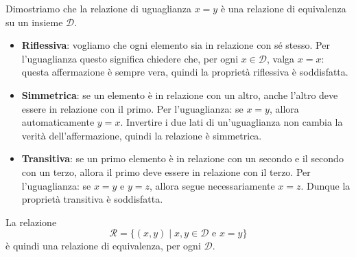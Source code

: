 \begin{esempio}
Dimostriamo che la relazione di uguaglianza \(x = y\) è una relazione di equivalenza su un insieme \(\mathcal{D}\).

\begin{itemize}
    \item \textbf{Riflessiva}: vogliamo che ogni elemento sia in relazione con sé stesso.
    Per l'uguaglianza questo significa chiedere che, per ogni \(x \in \mathcal{D}\), valga \(x = x\):
    questa affermazione è sempre vera, quindi la proprietà riflessiva è soddisfatta.

    \item \textbf{Simmetrica}: se un elemento è in relazione con un altro, anche l’altro deve essere
    in relazione con il primo. Per l'uguaglianza: se \(x = y\), allora automaticamente \(y = x\).
    Invertire i due lati di un'uguaglianza non cambia la verità dell'affermazione, quindi la relazione è simmetrica.

    \item \textbf{Transitiva}: se un primo elemento è in relazione con un secondo e il secondo con un terzo,
    allora il primo deve essere in relazione con il terzo. Per l'uguaglianza:
    se \(x = y\) e \(y = z\), allora segue necessariamente \(x = z\).
    Dunque la proprietà transitiva è soddisfatta.
\end{itemize}

La relazione
\[
\mathcal{R} = \{(x,y) \mid x,y \in \mathcal{D} \text{ e } x=y\}
\]
è quindi una relazione di equivalenza, per ogni  \(\mathcal{D}\).
\end{esempio}






